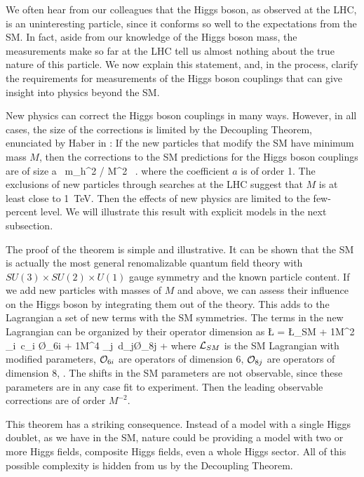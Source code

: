 We often hear from our colleagues that the Higgs boson, as observed at the LHC, is an uninteresting particle, since it conforms so well to the expectations from the SM.   In fact, aside from our knowledge of the Higgs boson mass, the measurements make so far at the LHC tell us almost nothing about the true nature of this particle.   We now 
explain this statement, and, in the process, clarify the requirements for measurements of the Higgs boson couplings that can give insight into physics beyond the SM. 

New physics can correct the Higgs boson couplings in many ways.  However, in all cases, the size of the corrections is limited by the Decoupling Theorem, enunciated by Haber in \cite{Haber:1994mt}:    If the new particles that modify the SM have minimum mass $M$, then  the corrections to the SM predictions for the Higgs boson couplings are of size 
\beq 
              a \,     m_h^2 / M^2   \  .
\eeqn
where the coefficient $a$ is of order 1.   The exclusions of new particles through searches at the LHC suggest that $M$ is at least close to 1~TeV.   Then the effects of  new physics are limited to the few-percent level.   We will illustrate this result with explicit models in the next subsection.

The proof of the theorem is simple and illustrative.   It can be shown that the SM is actually the most general renomalizable quantum field theory with $SU(3)\times SU(2)\times U(1)$ gauge symmetry and the known particle content.   If we add new particles with masses of $M$ and above, we can assess their influence on the Higgs boson by integrating them out of the theory.  This adds to the Lagrangian a set of new terms with the SM symmetries.   The terms in the new Lagrangian  can be organized by their operator dimension 
as 
\beq 
   {\L}  =  {\L}_{SM} + {1\over M^2} \sum_i\,  c_i \O_{6i} + {1\over M^4 } \sum_j\,  d_j\O_{8j} + \cdots
{}
where ${\cal L}_{SM}$ is the SM Lagrangian with modified parameters, ${\cal O}_{6i}$  are operators of dimension 6, ${\cal O}_{8j}$ are operators of dimension 8, \etc.   The shifts in the SM parameters are not observable, since these parameters are in any case fit to experiment.  Then the leading observable corrections are of order $M^{-2}$. 

This theorem has a striking consequence.  Instead of a model with a single Higgs doublet, as we have in the SM, nature could be providing  a model with two or more Higgs fields, composite Higgs fields, even a whole Higgs sector.  All of this possible complexity is hidden from us by the Decoupling Theorem. 

